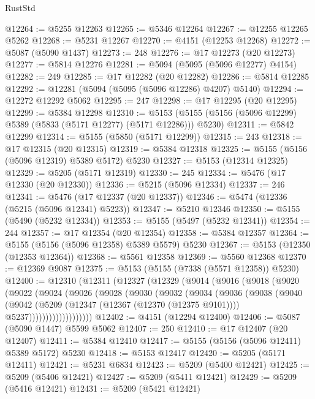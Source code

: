 \begin{lexlean}{RustStd}
\begin{coremodule}
@12264 := @5255 @12263
@12265 := @5346 @12264
@12267 := @12255 @12265 @5262
@12268 := @5231 @12267
@12270 := @4151 (@12253 @12268)
@12272 := @5087 (@5090 @1437)
@12273 := 248
@12276 := @17 @12273 (@20 @12273)
@12277 := @5814 @12276
@12281 := @5094 (@5095 (@5096 @12277) @4154)
@12282 := 249
@12285 := @17 @12282 (@20 @12282)
@12286 := @5814 @12285
@12292 := @12281 (@5094 (@5095 (@5096 @12286) @4207) @5140)
@12294 := @12272 @12292 @5062
@12295 := 247
@12298 := @17 @12295 (@20 @12295)
@12299 := @5384 @12298
@12310 := @5153 (@5155 (@5156 (@5096 @12299) @5389 (@5833 (@5171 @12277) (@5171 @12286))) @5230)
@12311 := @5842 @12299
@12314 := @5155 (@5850 (@5171 @12299))
@12315 := 243
@12318 := @17 @12315 (@20 @12315)
@12319 := @5384 @12318
@12325 := @5155 (@5156 (@5096 @12319) @5389 @5172) @5230
@12327 := @5153 (@12314 @12325)
@12329 := @5205 (@5171 @12319)
@12330 := 245
@12334 := @5476 (@17 @12330 (@20 @12330))
@12336 := @5215 (@5096 @12334)
@12337 := 246
@12341 := @5476 (@17 @12337 (@20 @12337))
@12346 := @5474 (@12336 (@5215 (@5096 @12341) @5223))
@12347 := @5210 @12346
@12350 := @5155 (@5490 (@5232 @12334))
@12353 := @5155 (@5497 (@5232 @12341))
@12354 := 244
@12357 := @17 @12354 (@20 @12354)
@12358 := @5384 @12357
@12364 := @5155 (@5156 (@5096 @12358) @5389 @5579) @5230
@12367 := @5153 (@12350 (@12353 @12364))
@12368 := @5561 @12358
@12369 := @5560 @12368
@12370 := @12369 @9087
@12375 := @5153 (@5155 (@7338 (@5571 @12358)) @5230)
@12400 := @12310
    (@12311
      (@12327
        (@12329
          (@9014
            (@9016
              (@9018
                (@9020
                  (@9022
                    (@9024
                      (@9026
                        (@9028
                          (@9030
                            (@9032
                              (@9034
                                (@9036
                                  (@9038
                                    (@9040
                                      (@9042
                                        (@5209
                                          (@12347 (@12367 (@12370 (@12375 @9101))))
                                          @5237)))))))))))))))))))
@12402 := @4151 (@12294 @12400)
@12406 := @5087 (@5090 @1447) @5599 @5062
@12407 := 250
@12410 := @17 @12407 (@20 @12407)
@12411 := @5384 @12410
@12417 := @5155 (@5156 (@5096 @12411) @5389 @5172) @5230
@12418 := @5153 @12417
@12420 := @5205 (@5171 @12411)
@12421 := @5231 @6834
@12423 := @5209 (@5400 @12421)
@12425 := @5209 (@5406 @12421)
@12427 := @5209 (@5411 @12421)
@12429 := @5209 (@5416 @12421)
@12431 := @5209 (@5421 @12421)

\end{coremodule}
\end{lexlean}
